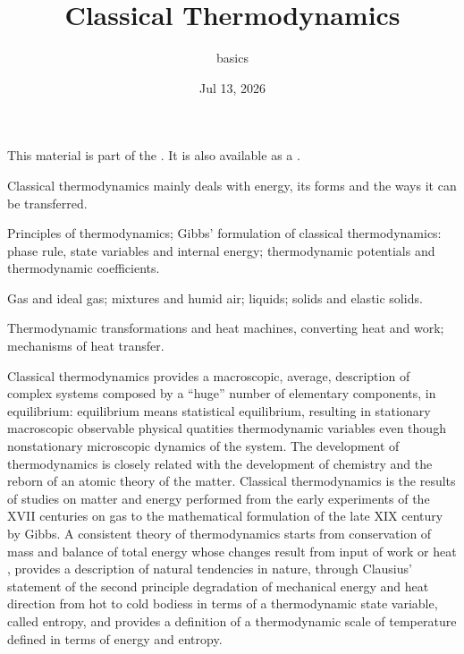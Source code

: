 \documentclass[letterpaper,10pt,english]{jupyterBook}
\title{Classical Thermodynamics}
\date{Jul 13, 2026}
\author{basics}
\begin{document}
\pagestyle{empty}
\sphinxmaketitle
\pagestyle{plain}
\sphinxtableofcontents
\pagestyle{normal}
\label{\detokenize{intro::doc}}


\sphinxAtStartPar
This material is part of the . It is also available as a .

\sphinxAtStartPar
Classical thermodynamics mainly deals with energy, its forms and the ways it can be transferred.

\sphinxAtStartPar
{} Principles of thermodynamics; Gibbs’ formulation of classical thermodynamics: phase rule, state variables and internal energy; thermodynamic potentials and thermodynamic coefficients.

\sphinxAtStartPar
{} Gas and ideal gas; mixtures and humid air; liquids; solids and elastic solids.

\sphinxAtStartPar
{} Thermodynamic transformations and heat machines, converting heat and work; mechanisms of heat transfer.

\sphinxAtStartPar
Classical thermodynamics provides a macroscopic, average, description of complex systems composed by a “huge” number of elementary components, in equilibrium: equilibrium means statistical equilibrium, resulting in stationary macroscopic observable physical quatities \sphinxhyphen{} thermodynamic variables \sphinxhyphen{} even though non\sphinxhyphen{}stationary microscopic dynamics of the system. The development of thermodynamics is closely related with the development of chemistry and the re\sphinxhyphen{}born of an atomic theory of the matter. Classical thermodynamics is the results of studies on matter and energy performed from the early experiments of the XVII centuries on gas to the mathematical formulation of the late XIX century by Gibbs. A consistent theory of thermodynamics starts from conservation of mass and balance of total energy \sphinxhyphen{} whose changes result from input of work or heat \sphinxhyphen{}, provides a description of natural tendencies in nature, through Clausius’ statement of the second principle \sphinxhyphen{} degradation of mechanical energy and heat direction from hot to cold bodiess \sphinxhyphen{} in terms of a thermodynamic state variable, called entropy, and provides a definition of a thermodynamic scale of temperature \sphinxhyphen{} defined in terms of energy and entropy.
\end{document}

